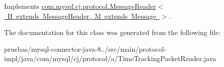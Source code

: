 Implements \mbox{\hyperlink{interfacecom_1_1mysql_1_1cj_1_1protocol_1_1_message_reader_a22a326215a91e4d7bff08d1f2c3e1b6d}{com.\+mysql.\+cj.\+protocol.\+Message\+Reader$<$ H extends Message\+Header, M extends Message $>$}}.



The documentation for this class was generated from the following file\+:\begin{DoxyCompactItemize}
\item 
pruebas/mysql-\/connector-\/java-\/8../src/main/protocol-\/impl/java/com/mysql/cj/protocol/a/Time\+Tracking\+Packet\+Reader.\+java\end{DoxyCompactItemize}
